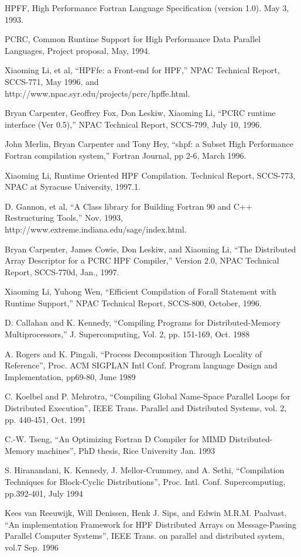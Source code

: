 \begin{thebibliography}{99}
HPFF, High Performance Fortran Language Specification (version 1.0).
May 3, 1993.

PCRC, Common Runtime Support for High Performance Data Parallel Languages,
Project proposal, May, 1994.

Xiaoming Li, et al, ``HPFfe: a Front-end for HPF,'' NPAC Technical
Report, SCCS-771, May 1996, and \\
http://www.npac.syr.edu/projects/pcrc/hpffe.html.

Bryan Carpenter, Geoffrey Fox, Don Leskiw, Xiaoming Li,
``PCRC runtime interface (Ver 0.5),'' NPAC Technical Report, SCCS-799,
July 10, 1996.

John Merlin, Bryan Carpenter and Tony Hey,
``shpf: a Subset High Performance Fortran compilation system,''
Fortran Journal, pp 2-6, March 1996.

 Xiaoming Li, Runtime Oriented HPF Compilation.
Technical Report, SCCS-773, NPAC at Syracuse University, 1997.1.

D. Gannon, et al, ``A Class library for Building Fortran 90 and C++ 
Restructuring Tools,'' Nov. 1993, \\
http://www.extreme.indiana.edu/sage/index.html.

Bryan Carpenter, James Cowie, Don Leskiw, and Xiaoming Li,
``The Distributed Array Descriptor for a PCRC HPF Compiler,''
Version 2.0, NPAC Technical Report, SCCS-770d, Jan., 1997.

Xiaoming Li, Yuhong Wen, ``Efficient Compilation of Forall
Statement with Runtime Support,'' NPAC Technical Report, 
SCCS-800, October, 1996.

D. Callahan and K. Kennedy, ``Compiling Programs for
Distributed-Memory Multiprocessors,'' J. Supercomputing, Vol. 2, pp.
151-169, Oct. 1988

A. Rogers and K. Pingali, ``Process Decomposition Through Locality of
Reference'', Proc. ACM SIGPLAN Intl Conf. Program language Design and
Implementation, pp69-80, June 1989

C. Koelbel and P. Mehrotra, ``Compiling Global Name-Space Parallel
Loops for Distributed Execution'', IEEE Trans. Parallel and
Distributed Systems, vol. 2, pp. 440-451, Oct. 1991

C.-W. Tseng, ``An Optimizing Fortran D Compiler for MIMD
Distributed-Memory machines'', PhD thesis, Rice University Jan. 1993

S. Hiranandani, K. Kennedy, J. Mellor-Crummey, and A. Sethi,
``Compilation Techniques for Block-Cyclic Distributions'', Proc. Intl.
Conf. Supercomputing, pp.392-401, July 1994

Kees van Reeuwijk, Will Denissen, Henk J. Sips, and Edwin M.R.M.
Paalvast, ``An implementation Framework for HPF Distributed Arrays on
Message-Passing Parallel Computer Systems'', IEEE Trans. on parallel
and distributed system, vol.7 Sep. 1996

\end{thebibliography}



